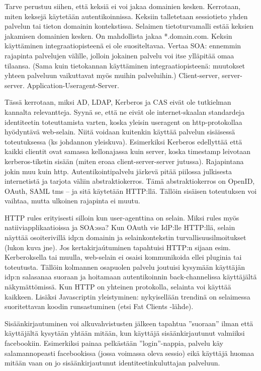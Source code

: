 \documentclass[finnish,gradu]{tktltiki}
\begin{document}
  Tarve perustuu siihen, että keksiä ei voi jakaa domainien kesken. Kerrotaan, miten keksejä käytetään autentikoinnissa. Keksiin talletetaan sessiotieto yhden palvelun tai tieton domainin kontekstissa. Selaimen tietoturvamalli estää keksien jakamisen domainien kesken. On mahdollista
jakaa *.domain.com. Keksin käyttäminen integraatiopisteenä ei ole suositeltavaa. Vertaa SOA:
ennemmin rajapinta palvelujen välille, jolloin jokainen palvelu voi itse ylläpitää omaa tilaansa.
(Sama kuin tietokannan käyttäminen integraatiopisteenä: muutokset yhteen palveluun vaikuttavat
myös muihin palveluihin.) Client-server, server-server. Application-Useragent-Server.


  Tässä kerrotaan, miksi AD, LDAP, Kerberos ja CAS eivät ole tutkielman kannalta relevantteja. Syynä se, että ne eivät ole internet-skaalan standardeja identiteetin toteuttamista varten, koska yleisin useragent on http-protokollaa hyödyntävä web-selain. Niitä voidaan kuitenkin käyttää palvelun sisäisessä toteutuksessa (ks johdannon yleiskuva). Esimerkiksi Kerberos edellyttää että kaikki clientit ovat samassa kellonajassa kuin server, koska timestamp leivotaan kerberos-tiketin sisään (miten eroaa client-server-server jutussa). Rajapintana jokin muu kuin http. Autentikointipalvelu järkevä pitää piilossa julkisesta internetistä ja tarjota väliin abstraktiokerros. Tämä abstraktiokerros on OpenID, OAuth, SAML tms -- ja sitä käytetään HTTP:llä. Tällöin sisäisen toteutuksen voi vaihtaa, mutta ulkoinen rajapinta ei muutu.

  HTTP rules erityisesti silloin kun user-agenttina on selain. Miksi rules myös natiiviapplikaatioissa ja SOA:ssa?
  Kun OAuth vie IdP:lle HTTP:llä, selain näyttää osoiterivillä idp:n domainin ja selainkontekstin turvallisuusilmoitukset (lukon kuva jne). Jos kertakirjaútuminen tapahtuisi HTTP:n sijaan esim. Kerberoksella tai muulla, web-selain ei osaisi kommunikoida ellei pluginia tai toteutusta. Tällöin kolmannen osapuolen palvelu joutuisi kysymään käyttäjän idp:n salasanaa suoraan ja hoitamaan autentikoinnin back-channelissa käyttäjältä näkymättömissä.
  Kun HTTP on yhteinen protokolla, selainta voi käyttää kaikkeen. Lisäksi Javascriptin yleistyminen: nykyisellään trendinä on selaimessa suoritettavan koodin runsastuminen (etsi Fat Clients -lähde).

  Sisäänkirjautuminen voi alkuvahvistusten jälkeen tapahtua ''suoraan'' ilman että käyttäjältä kysytään yhtään mitään, kun käyttäjä sisäänkirjautunut valmiiksi facebookiin. Esimerkiksi painaa pelkästään ''login''-nappia, palvelu käy salamannopeasti facebookissa (jossa voimassa oleva sessio) eikä käyttäjä huomaa mitään vaan on jo sisäänkirjautunut identiteetinkuluttajan palveluun.
\end{document}
